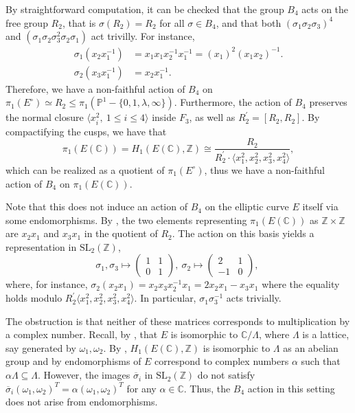 \documentclass[10pt]{amsart}
\theoremstyle{definition}
\newcommand{\Z}{\mathbb{Z}}
\begin{document}
 
By straightforward computation, it can be checked that the group $B_4$ acts on the free group $R_2$, that is $\sigma(R_2)=R_2$ for all $\sigma\in B_4$, and that both $(\sigma_1\sigma_2\sigma_3)^4$ and $(\sigma_1 \sigma_2 \sigma_3^2 \sigma_2 \sigma_1) $ act trivilly. For instance, 
\begin{align*}
  \sigma_1(x_2x_1^{-1})&=x_1 x_1 x_2^{-1}x_1^{-1}= (x_1)^2(x_1x_2)^{-1}.
\\
\sigma_2(x_3x_1^{-1})&=x_2 x_1^{-1}.
\end{align*}
Therefore, we have a non-faithful action of $B_4$ on $\pi_1(E^\circ) \simeq R_2\leq \pi_1(\mathbb{P}^1-\{0,1,\lambda,\infty\})$. Furthermore, the action of $B_4$ preserves the normal closure $\langle x_i^2, \ 1\leq i \leq 4 \rangle$ inside $F_3$, as well as $R_2^\prime = [R_2,R_2]$. By compactifying the cusps, we have that
\[\pi_1(E(\mathbb{C})) = H_1(E(\mathbb{C}), \Z) \cong \frac{R_2}{R_2^\prime \cdot\langle x_1^2,x_2^2,x_3^2,x_4^2\rangle}, \] which can be realized as a quotient of $\pi_1(E^\circ)$, thus we have a non-faithful action of $B_4$ on $\pi_1(E(\mathbb{C}))$.

Note that this does not induce an action of $B_4$ on the elliptic curve $E$ itself via some endomorphisms. 
By \cite[pg. 20]{MR4117575}, the two elements representing $\pi_1(E(\mathbb{C}))$ as $\Z\times \Z$ are $x_2x_1$ and $x_3x_1$ in the quotient of $R_2$. The action on this basis yields a representation in $\mathrm{SL}_2(\Z)$,
\[\sigma_1,\sigma_3 \mapsto 
\begin{pmatrix}
1 & 1 \\ 
0 & 1
\end{pmatrix}, \ 
\sigma_2 \mapsto 
\begin{pmatrix}
2 & 1 \\ 
-1 & 0
\end{pmatrix}, \ 
\] 
where, for instance, $\sigma_2(x_2x_1) = x_2x_3x_2^{-1}x_1 = 2 x_2x_1 - x_3x_1 $ where the equality holds modulo $R_2^\prime\langle x_1^2,x_2^2,x_3^2,x_4^2\rangle$. In particular, $\sigma_1\sigma_3^{-1}$ acts trivially.

The obstruction is that neither of these matrices corresponds to multiplication by a complex number. Recall, by \cite[Ch. 4]{Silverman92}, that $E$ is isomorphic to $\mathbb{C}/\Lambda$, where $\Lambda$ is a lattice, say generated by $\omega_1,\omega_2$. By \cite[Prop. 5.6]{Silverman92}, $H_1(E(\mathbb{C}),\Z)$ is isomorphic to $\Lambda$ as an abelian group and by \cite[Thm. 4.1 ]{Silverman92} endomorphisms of $E$ correspond to complex numbers $\alpha$ such that $\alpha \Lambda \subseteq \Lambda$. However, the images $\overline{\sigma}_i$ in $\mathrm{SL}_2(\Z)$ do not satisfy $\overline{\sigma}_i (\omega_1,\omega_2)^T = \alpha (\omega_1,\omega_2)^T$ for any $\alpha \in \mathbb{C}$. Thus, the $B_4$ action in this setting does not arise from endomorphisms.
\end{document}
